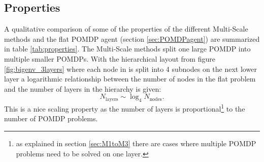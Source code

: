 \subsection{Properties}\label{subsec:Multi-Scale_properties}
A qualitative comparison of some of the properties of the different Multi-Scale methods and the flat POMDP agent (section \ref{sec:POMDPagent}) are summarized in table \ref{tab:properties}.  The Multi-Scale methods split one large POMDP into multiple smaller POMDPs. With the hierarchical layout from figure \ref{fig:bigenv_3layers} where each node in is split into 4 subnodes on the next lower layer a logarithmic relationship between the number of nodes in the flat problem and the number of layers in the hierarchy is given:
\begin{equation}
    N_\text{layers} \sim \log_4 N_\text{nodes}.
\end{equation}
This is a nice scaling property as the number of layers is proportional\footnote{as explained in section \ref{sec:M1toM3} there are cases where multiple POMDP problems need to be solved on one layer.} to the number of POMDP problems. \\

